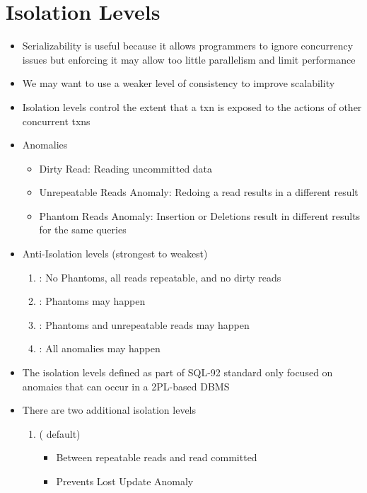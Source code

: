 \documentclass[11pt]{article}
\begin{document}
\section{Isolation Levels}
\begin{itemize}
    \item Serializability is useful because it allows programmers to ignore concurrency issues but enforcing it may allow too little parallelism and limit performance
    \item We may want to use a weaker level of consistency to improve scalability
    \item Isolation levels control the extent that a txn is exposed to the actions of other concurrent txns
    \item Anomalies
    \begin{itemize}
        \item Dirty Read: Reading uncommitted data
        \item Unrepeatable Reads Anomaly: Redoing a read results in a different result
        \item Phantom Reads Anomaly: Insertion or Deletions result in different results for the same queries
    \end{itemize}
    \item Anti-Isolation levels (strongest to weakest)
    \begin{enumerate}
        \item {}: No Phantoms, all reads repeatable, and no dirty reads
        \item {}: Phantoms may happen
        \item {}: Phantoms and unrepeatable reads may happen
        \item {}: All anomalies may happen
    \end{enumerate}
    \item The isolation levels defined as part of SQL-92 standard only focused on anomaies that can occur in a 2PL-based DBMS~\cite{p1-berenson}
    \item There are two additional isolation levels
    \begin{enumerate}
        \item {} ( default)
        \begin{itemize}
            \item Between repeatable reads and read committed
            \item Prevents Lost Update Anomaly

\end{itemize}
\end{enumerate}
\end{itemize}
\end{document}
